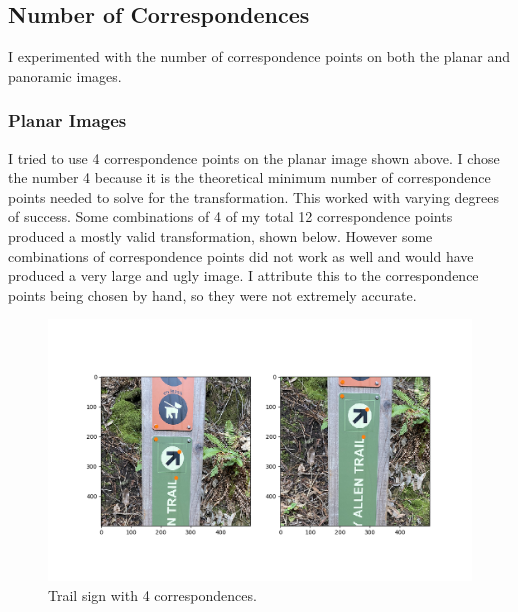\documentclass[]{article}
\begin{document}
	\newpage
		
	\subsection{Number of Correspondences}
	I experimented with the number of correspondence points on both the planar and panoramic images. 
	
	\subsubsection{Planar Images}
	\vskip 10pt
	I tried to use 4 correspondence points on the planar image shown above. I chose the number 4 because it is the theoretical minimum number of correspondence points needed to solve for the transformation. This worked with varying degrees of success. Some combinations of 4 of my total 12 correspondence points produced a mostly valid transformation, shown below. However some combinations of correspondence points did not work as well and would have produced a very large and ugly image. I attribute this to the correspondence points being chosen by hand, so they were not extremely accurate. 
	
	\begin{figure}[H]
		\centering
		\includegraphics[width=6.5in]{test_images/sign_4_correspondences.png}
		\caption{Trail sign with 4 correspondences.}
	\end{figure}
	
\end{document}
